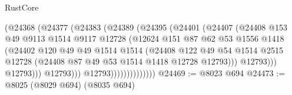 \begin{lexlean}{RustCore}
\begin{coremodule}
                                (@24368
                                  (@24377
                                    (@24383
                                      (@24389
                                        (@24395
                                          (@24401
                                            (@24407
                                              (@24408
                                                @153
                                                @49
                                                @9113
                                                @1514
                                                @9117
                                                @12728
                                                (@12624
                                                  @151
                                                  @87
                                                  @62
                                                  @53
                                                  @1556
                                                  @1418
                                                  (@24402
                                                    @120
                                                    @49
                                                    @49
                                                    @1514
                                                    @1514
                                                    (@24408
                                                      @122
                                                      @49
                                                      @54
                                                      @1514
                                                      @2515
                                                      @12728
                                                      (@24408
                                                        @87
                                                        @49
                                                        @53
                                                        @1514
                                                        @1418
                                                        @12728
                                                        @12793)))
                                                  @12793)))
                                            @12793)))
                                      @12793)))
                                @12793))))))))))))))
@24469 := @8023 @694
@24473 := @8025 (@8029 @694) (@8035 @694)

\end{coremodule}
\end{lexlean}
